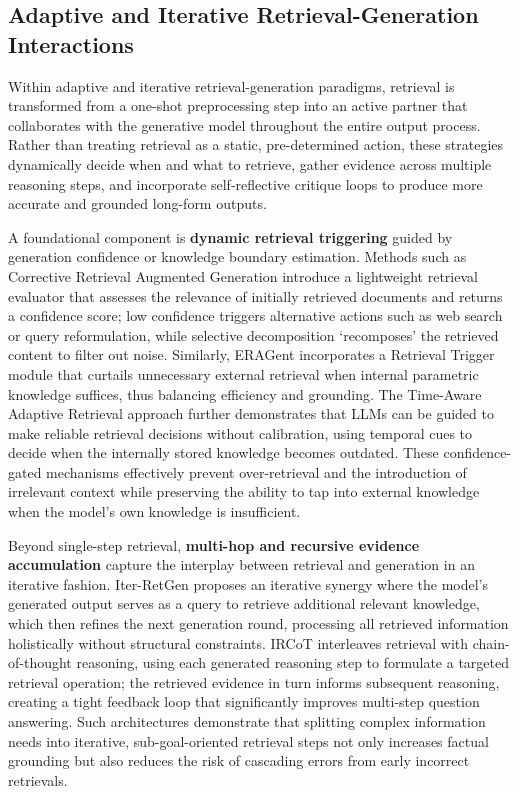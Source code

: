 \documentclass[11pt,a4paper]{article}
\begin{document}
\subsection{Adaptive and Iterative Retrieval-Generation Interactions}


Within adaptive and iterative retrieval-generation paradigms, retrieval is transformed from a one-shot preprocessing step into an active partner that collaborates with the generative model throughout the entire output process. Rather than treating retrieval as a static, pre-determined action, these strategies dynamically decide when and what to retrieve, gather evidence across multiple reasoning steps, and incorporate self-reflective critique loops to produce more accurate and grounded long-form outputs.

A foundational component is \textbf{dynamic retrieval triggering} guided by generation confidence or knowledge boundary estimation. Methods such as Corrective Retrieval Augmented Generation \cite{arxiv:2401.15884v2} introduce a lightweight retrieval evaluator that assesses the relevance of initially retrieved documents and returns a confidence score; low confidence triggers alternative actions such as web search or query reformulation, while selective decomposition `recomposes' the retrieved content to filter out noise. Similarly, ERAGent \cite{arxiv:2405.06683v1} incorporates a Retrieval Trigger module that curtails unnecessary external retrieval when internal parametric knowledge suffices, thus balancing efficiency and grounding. The Time-Aware Adaptive Retrieval approach \cite{arxiv:2402.16457v1} further demonstrates that LLMs can be guided to make reliable retrieval decisions without calibration, using temporal cues to decide when the internally stored knowledge becomes outdated. These confidence-gated mechanisms effectively prevent over-retrieval and the introduction of irrelevant context while preserving the ability to tap into external knowledge when the model's own knowledge is insufficient.

Beyond single-step retrieval, \textbf{multi-hop and recursive evidence accumulation} capture the interplay between retrieval and generation in an iterative fashion. Iter-RetGen \cite{arxiv:2305.15294v2} proposes an iterative synergy where the model's generated output serves as a query to retrieve additional relevant knowledge, which then refines the next generation round, processing all retrieved information holistically without structural constraints. IRCoT \cite{arxiv:2212.10509v2} interleaves retrieval with chain-of-thought reasoning, using each generated reasoning step to formulate a targeted retrieval operation; the retrieved evidence in turn informs subsequent reasoning, creating a tight feedback loop that significantly improves multi-step question answering. Such architectures demonstrate that splitting complex information needs into iterative, sub-goal-oriented retrieval steps not only increases factual grounding but also reduces the risk of cascading errors from early incorrect retrievals.
\end{document}
